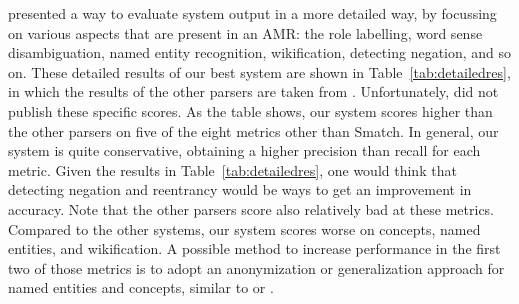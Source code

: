 \documentclass[a4paper,10pt,twoside]{article}
\begin{document}
 presented a way to evaluate system output in a more detailed way, by focussing on various aspects that are present in an AMR: the role labelling, word sense disambiguation, named entity recognition, wikification, detecting negation, and so on.
These detailed results of our best system are shown in Table~\ref{tab:detailedres}, in which
the results of the other parsers are taken from . Unfortunately,  did not publish these specific scores. As the table shows, our system scores higher than the other parsers on five of the eight metrics other than Smatch. In general, our system is quite conservative, obtaining a higher precision than recall for each metric.
Given the results in Table~\ref{tab:detailedres}, one would think that detecting negation and reentrancy would be ways to get an improvement in accuracy. Note that the other parsers score also relatively bad at these metrics. Compared to the other systems, our system scores worse on concepts, named entities, and wikification. A possible method to increase performance in the first two of those metrics is to adopt an anonymization or generalization approach for named entities and concepts, similar to  or .
\end{document}
